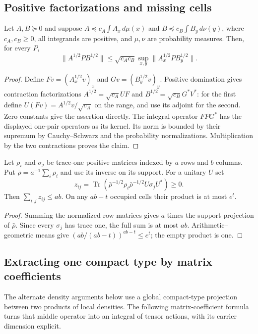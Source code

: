\subsection{Positive factorizations and missing cells}\label{ten:factorizations}
\begin{lemma}\label{ten:positive-mixtures}
Let $A,B\succeq0$ and suppose $A\preceq c_A\int A_x\,d\mu(x)$ and $B\preceq c_B\int B_y\,d\nu(y)$, where $c_A,c_B\ge0$, all integrands are positive, and $\mu,\nu$ are probability measures. Then, for every $P$,
\[
 \|A^{1/2}PB^{1/2}\|\le\sqrt{c_Ac_B}\sup_{x,y}\|A_x^{1/2}PB_y^{1/2}\|.
\]
\end{lemma}
\begin{proof}
Define $Fv=(A_x^{1/2}v)_x$ and $Gv=(B_y^{1/2}v)_y$. Positive domination gives contraction factorizations $A^{1/2}=\sqrt{c_A}UF$ and $B^{1/2}=\sqrt{c_B}G^*V^*$: for the first define $U(Fv)=A^{1/2}v/\sqrt{c_A}$ on the range, and use its adjoint for the second. Zero constants give the assertion directly. The integral operator $FPG^*$ has the displayed one-pair operators as its kernel. Its norm is bounded by their supremum by Cauchy--Schwarz and the probability normalizations. Multiplication by the two contractions proves the claim.
\end{proof}

\begin{lemma}\label{ten:missing-cells}
Let $\rho_i$ and $\sigma_j$ be trace-one positive matrices indexed by $a$ rows and $b$ columns. Put $\bar\rho=a^{-1}\sum_i\rho_i$ and use its inverse on its support. For a unitary $U$ set
\[
 z_{ij}=\operatorname{Tr}(\bar\rho^{-1/2}\rho_i\bar\rho^{-1/2}U\sigma_jU^*)\ge0.
\]
Then $\sum_{i,j}z_{ij}\le ab$. On any $ab-t$ occupied cells their product is at most $e^t$.
\end{lemma}
\begin{proof}
Summing the normalized row matrices gives $a$ times the support projection of $\bar\rho$. Since every $\sigma_j$ has trace one, the full sum is at most $ab$. Arithmetic--geometric means give $(ab/(ab-t))^{ab-t}\le e^t$; the empty product is one.
\end{proof}

\subsection{Extracting one compact type by matrix coefficients}

The alternate density arguments below use a global compact-type
projection between two products of local densities. The following
matrix-coefficient formula turns that middle operator into an integral
of tensor actions, with its carrier dimension explicit.

